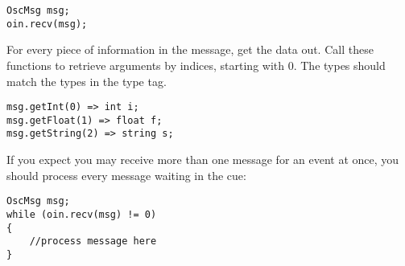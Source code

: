 \begin{verbatim}
OscMsg msg;
oin.recv(msg);
\end{verbatim}
For every piece of information in the message, get the data out. Call these functions to retrieve arguments by indices, starting with 0. The types should match the types in the type tag.
\begin{verbatim}
msg.getInt(0) => int i;
msg.getFloat(1) => float f;
msg.getString(2) => string s;
\end{verbatim}

If you expect you may receive more than one message for an event at once, you should process every message waiting in the cue:

\begin{verbatim}
OscMsg msg;
while (oin.recv(msg) != 0)
{
    //process message here
}
\end{verbatim}
